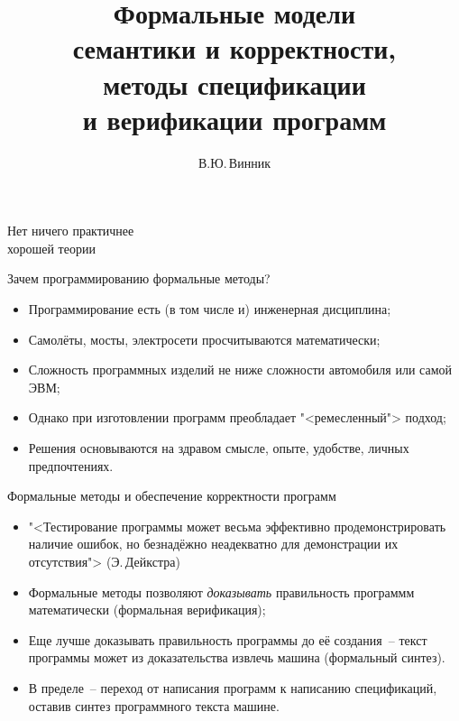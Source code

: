 \documentclass[landscape]{slides}
\begin{document}
\author{В.Ю.\,Винник}

\title{%
Формальные модели\\%
семантики и корректности,\\%
методы спецификации\\%
и верификации программ}

\date{}

\maketitle

\begin{slide}
\begin{center}
\begin{LARGE}
Нет ничего практичнее\\%
хорошей теории
\end{LARGE}
\end{center}
\end{slide}

\begin{slide}
Зачем программированию формальные методы?
\begin{itemize}
\item Программирование есть (в том числе и) инженерная дисциплина;
\item Самолёты, мосты, электросети просчитываются математически;
\item Сложность программных изделий не ниже сложности автомобиля
        или самой ЭВМ;
\item Однако при изготовлении программ преобладает "<ремесленный">
        подход;
\item Решения основываются на здравом смысле, опыте, удобстве,
        личных предпочтениях.
\end{itemize}
\end{slide}

\begin{slide}
Формальные методы и обеспечение корректности программ
\begin{itemize}
\item "<Тестирование программы может весьма эффективно продемонстрировать
        наличие ошибок, но безнадёжно неадекватно для демонстрации их
        отсутствия"> (Э.\,Дейкстра)
\item Формальные методы позволяют \emph{доказывать} правильность программм
        математически (формальная верификация);
\item Еще лучше доказывать правильность программы до её создания~-- текст
        программы может из доказательства извлечь машина (формальный синтез).
\item В пределе~-- переход от написания программ к написанию спецификаций,
        оставив синтез программного текста машине.
\end{itemize}
\end{slide}
\end{document}
